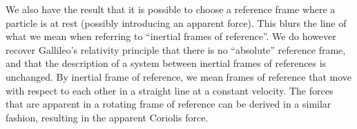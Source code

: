We also have the result that it is possible to choose a reference frame where a particle is at rest (possibly introducing an apparent force). This blurs the line of what we mean when referring to ``inertial frames of reference''. We do however recover Gallileo's relativity principle that there is no ``absolute'' reference frame, and that the description of a system between inertial frames of references is unchanged. By inertial frame of reference, we mean frames of reference that move with respect to each other in a straight line at a constant velocity. The forces that are apparent in a rotating frame of reference can be derived in a similar fashion, resulting in the apparent Coriolis force.

